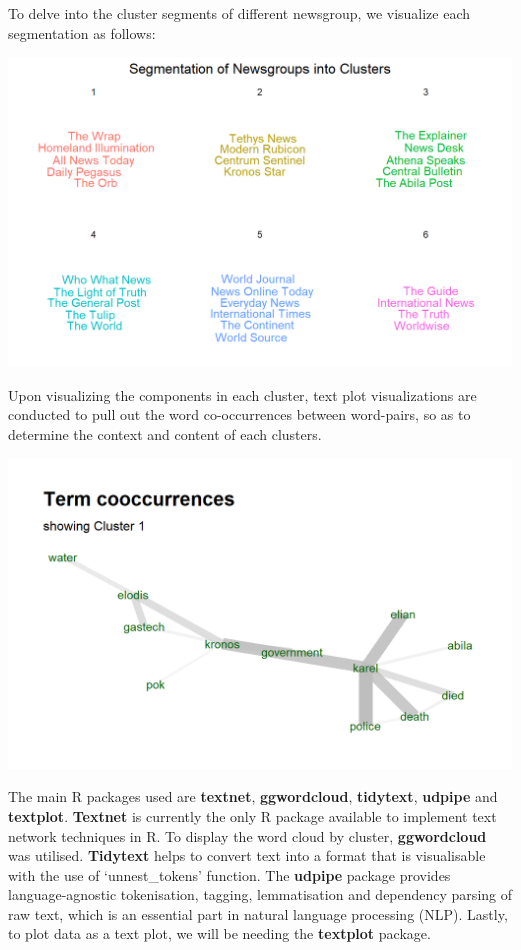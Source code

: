 \documentclass{acm_proc_article-sp}
\begin{document}
To delve into the cluster segments of different newsgroup, we visualize
each segmentation as follows:

\includegraphics{img/image04.png}

Upon visualizing the components in each cluster, text plot
visualizations are conducted to pull out the word co-occurrences between
word-pairs, so as to determine the context and content of each clusters.

\includegraphics{img/image05.png}

The main R packages used are \textbf{textnet}, \textbf{ggwordcloud},
\textbf{tidytext}, \textbf{udpipe} and \textbf{textplot}.
\textbf{Textnet} is currently the only R package available to implement
text network techniques in R. To display the word cloud by cluster,
\textbf{ggwordcloud} was utilised. \textbf{Tidytext} helps to convert
text into a format that is visualisable with the use of `unnest\_tokens'
function. The \textbf{udpipe} package provides language-agnostic
tokenisation, tagging, lemmatisation and dependency parsing of raw text,
which is an essential part in natural language processing (NLP). Lastly,
to plot data as a text plot, we will be needing the \textbf{textplot}
package.
\end{document}
